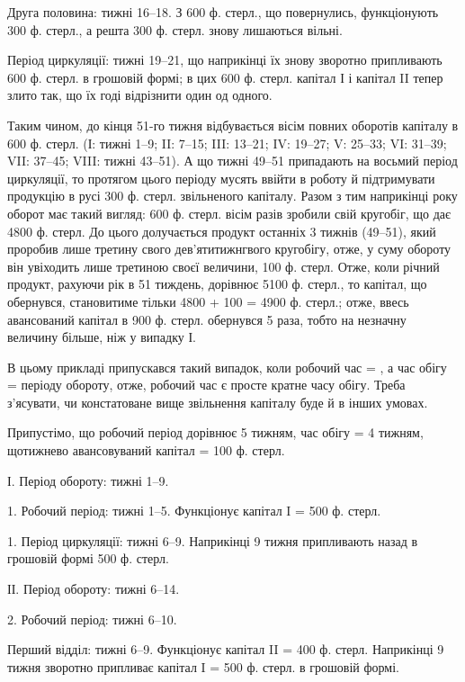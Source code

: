 Друга половина: тижні 16--18. З 600 ф. стерл., що повернулись,
функціонують 300 ф. стерл., а решта 300 ф. стерл. знову лишаються
вільні.

Період циркуляції: тижні 19--21, що наприкінці їх знову зворотно
припливають 600 ф. стерл. в грошовій формі; в цих 600 ф. стерл.
капітал І і капітал II тепер злито так, що їх годі відрізнити один од одного.

Таким чином, до кінця 51-го тижня відбувається вісім повних оборотів
капіталу в 600 ф. стерл. (І: тижні 1--9; II: 7--15; III: 13--21;
IV: 19--27; V: 25--33; VI: 31--39; VII: 37--45; VIII: тижні
43--51). А що тижні 49--51 припадають на восьмий період циркуляції,
то протягом цього періоду мусять ввійти в роботу й підтримувати
продукцію в русі 300 ф. стерл. звільненого капіталу. Разом з тим наприкінці
року оборот має такий вигляд: 600 ф. стерл. вісім разів зробили
свій кругобіг, що дає 4800 ф. стерл. До цього долучається продукт
останніх 3 тижнів (49--51), який проробив лише третину свого дев’ятитижнгвого
кругобігу, отже, у суму обороту він увіходить лише третиною
своєї величини, 100 ф. стерл. Отже, коли річний продукт, рахуючи рік в
51 тиждень, дорівнює 5100 ф. стерл., то капітал, що обернувся, становитиме
тільки 4800 + 100 = 4900 ф. стерл.; отже, ввесь авансований капітал
в 900 ф. стерл. обернувся 5 раза, тобто на незначну величину більше,
ніж у випадку І.

В цьому прикладі припускався такий випадок, коли робочий час = ,
а час обігу =  періоду обороту, отже, робочий час є просте кратне
часу обігу. Треба з’ясувати, чи констатоване вище звільнення капіталу
буде й в інших умовах.

Припустімо, що робочий період дорівнює 5 тижням, час обігу = 4 тижням,
щотижнево авансовуваний капітал = 100 ф. стерл.

І. Період обороту: тижні 1--9.

1. Робочий період: тижні 1--5. Функціонує капітал I = 500 ф. стерл.

1. Період циркуляції: тижні 6--9. Наприкінці 9 тижня припливають
назад в грошовій формі 500 ф. стерл.

ІІ. Період обороту: тижні 6--14.

2. Робочий період: тижні 6--10.

Перший відділ: тижні 6--9. Функціонує капітал II = 400 ф. стерл.
Наприкінці 9 тижня зворотно припливає капітал I = 500 ф. стерл. в грошовій
формі.

